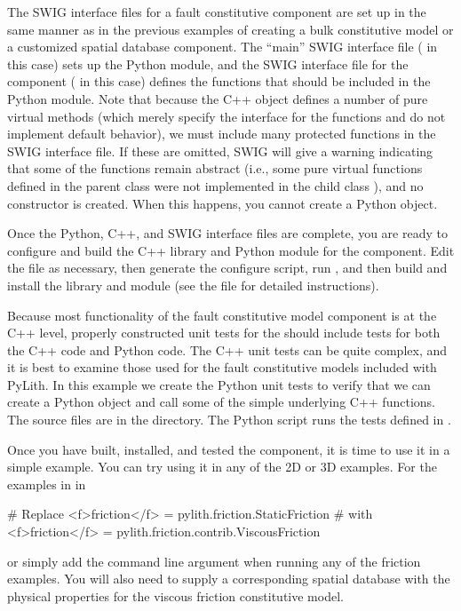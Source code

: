 The SWIG interface files for a fault constitutive component are set up
in the same manner as in the previous examples of creating a bulk
constitutive model or a customized spatial database component. The
``main'' SWIG interface file ( in this
case) sets up the Python module, and the SWIG interface file for the
component ( in this case) defines the
functions that should be included in the Python module. Note that
because the C++  object defines a number of pure
virtual methods (which merely specify the interface for the functions
and do not implement default behavior), we must include many protected
functions in the SWIG interface file. If these are omitted, SWIG will
give a warning indicating that some of the functions remain abstract
(i.e., some pure virtual functions defined in the parent class
 were not implemented in the child class
), and no constructor is created. When this
happens, you cannot create a  Python object.

Once the Python, C++, and SWIG interface files are complete, you are
ready to configure and build the C++ library and Python module for the
component. Edit the  file as necessary, then
generate the configure script, run , and then
build and install the library and module (see the 
file for detailed instructions).

Because most functionality of the fault constitutive model component
is at the C++ level, properly constructed unit tests for the
 should include tests for both the C++ code and
Python code. The C++ unit tests can be quite complex, and it is best
to examine those used for the fault constitutive models included with
PyLith. In this example we create the Python unit tests to verify that
we can create a  Python object and call some
of the simple underlying C++ functions.  The source files are in the
 directory.  The
 Python script runs the tests defined in
.

Once you have built, installed, and tested the 
component, it is time to use it in a simple example. You can try using
it in any of the 2D or 3D examples. For the examples in 
in 
\begin{cfg}
# Replace
<f>friction</f> = pylith.friction.StaticFriction
# with
<f>friction</f> = pylith.friction.contrib.ViscousFriction
\end{cfg}
or simply add the command line argument
when running any of the friction examples. You will also need to
supply a corresponding spatial database with the physical properties
for the viscous friction constitutive model.
